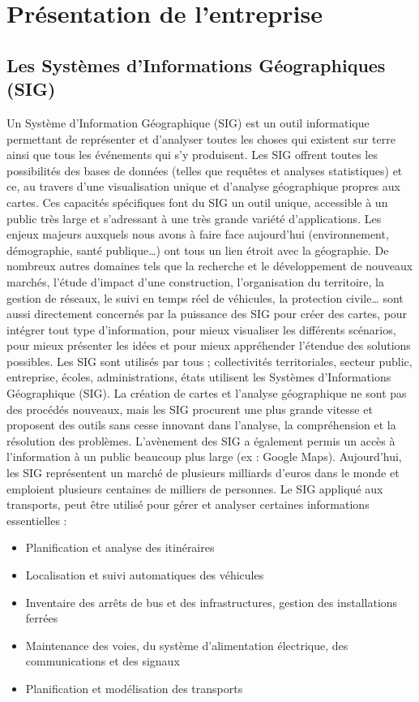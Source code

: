 \chapter{Présentation de l'entreprise}
\label{PresentationEntreprise}

\section{Les Systèmes d’Informations Géographiques (SIG)}\label{sig}

Un Système d’Information Géographique (SIG) est un outil informatique permettant de représenter et d’analyser toutes les choses qui existent sur terre ainsi que tous les événements qui s’y produisent.
Les SIG offrent toutes les possibilités des bases de données (telles que requêtes et analyses statistiques) et ce, au travers d’une visualisation unique et d’analyse géographique propres aux cartes. Ces capacités spécifiques font du SIG un outil unique, accessible à un public très large et s’adressant à une très grande variété d’applications. 
Les enjeux majeurs auxquels nous avons à faire face aujourd’hui (environnement, démographie, santé publique…) ont tous un lien étroit avec la géographie. De nombreux autres domaines tels que la recherche et le développement de nouveaux marchés, l’étude d’impact d’une construction, l’organisation du territoire, la gestion de réseaux, le suivi en temps réel de véhicules, la protection civile… sont aussi directement concernés par la puissance des SIG pour créer des cartes, pour intégrer tout type d’information, pour mieux visualiser les différents scénarios, pour mieux présenter les idées et pour mieux appréhender l’étendue des solutions possibles.
Les SIG sont utilisés par tous ; collectivités territoriales, secteur public, entreprise, écoles, administrations, états utilisent les Systèmes d’Informations Géographique (SIG). La création de cartes et l’analyse géographique ne sont pas des procédés nouveaux, mais les SIG procurent une plus grande vitesse et proposent des outils sans cesse innovant dans l’analyse, la compréhension et la résolution des problèmes.
L’avènement des SIG a également permis un accès à l’information à un public beaucoup plus large (ex : Google Maps). Aujourd’hui, les SIG représentent un marché de plusieurs milliards d'euros dans le monde et emploient plusieurs centaines de milliers de personnes. 
Le SIG appliqué aux transports, peut être utilisé pour gérer et analyser certaines informations essentielles :
\begin{itemize}
\item Planification et analyse des itinéraires 
\item Localisation et suivi automatiques des véhicules 
\item Inventaire des arrêts de bus et des infrastructures, gestion des installations ferrées 
\item Maintenance des voies, du système d'alimentation électrique, des communications et des signaux 
\item Planification et modélisation des transports
\end{itemize}

